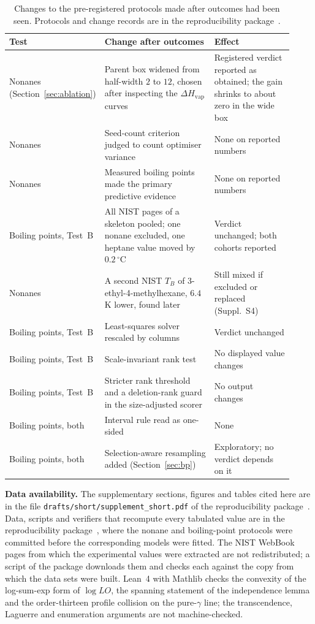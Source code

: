 \documentclass[a5paper, 10pt]{article}
\theoremstyle{plain}
\theoremstyle{remark}
\theoremstyle{definition}
\begin{document}
\begin{table}[htbp]
\centering
\caption{Changes to the pre-registered protocols made after outcomes
had been seen. Protocols and change records are in the
reproducibility package~\cite{LoyolaRepo}.}
\label{tab:deviations}
\scriptsize
\setlength{\tabcolsep}{3pt}
\begin{tabular}{p{0.2\linewidth}p{0.42\linewidth}p{0.3\linewidth}}
\toprule
Test & Change after outcomes & Effect\\
\midrule
Nonanes (Section~\ref{sec:ablation}) & Parent box widened from half-width
$2$ to $12$, chosen after inspecting the $\Delta H_{\mathrm{vap}}$ curves &
Registered verdict reported as obtained; the gain shrinks to about
zero in the wide box\\
Nonanes & Seed-count criterion judged to count optimiser variance &
None on reported numbers\\
Nonanes & Measured boiling points made the primary predictive evidence &
None on reported numbers\\
Boiling points, Test~B & All NIST pages of a skeleton pooled; one
nonane excluded, one heptane value moved by $0.2\,^{\circ}$C &
Verdict unchanged; both cohorts reported\\
Nonanes & A second NIST $T_B$ of 3-ethyl-4-methylhexane, $6.4$\,K
lower, found later & Still mixed if excluded or replaced (Suppl.~S4)\\
Boiling points, Test~B & Least-squares solver rescaled by columns &
Verdict unchanged\\
Boiling points, Test~B & Scale-invariant rank test & No displayed value changes\\
Boiling points, Test~B & Stricter rank threshold and a deletion-rank guard in the size-adjusted scorer & No output changes\\
Boiling points, both & Interval rule read as one-sided & None\\
Boiling points, both & Selection-aware resampling added
(Section~\ref{sec:bp}) & Exploratory; no verdict depends on it\\
\bottomrule
\end{tabular}
\end{table}

\medskip
\noindent\textbf{Data availability.} The supplementary sections, figures and
tables cited here are in the file \texttt{drafts/short/supplement\_short.pdf} of
the reproducibility package~\cite{LoyolaRepo}. Data, scripts and verifiers that
recompute every tabulated value are in the reproducibility
package~\cite{LoyolaRepo}, where the nonane and boiling-point
protocols were committed before the corresponding models were fitted.
The NIST WebBook pages from which the experimental values were
extracted are not redistributed; a script of the package downloads
them and checks each against the copy from which the data sets were
built. Lean~4 with Mathlib checks the convexity of the log-sum-exp form
of $\log LO$, the spanning statement of the independence lemma and the
order-thirteen profile collision on the pure-$\gamma$ line; the
transcendence, Laguerre and enumeration arguments are not
machine-checked.
\end{document}
